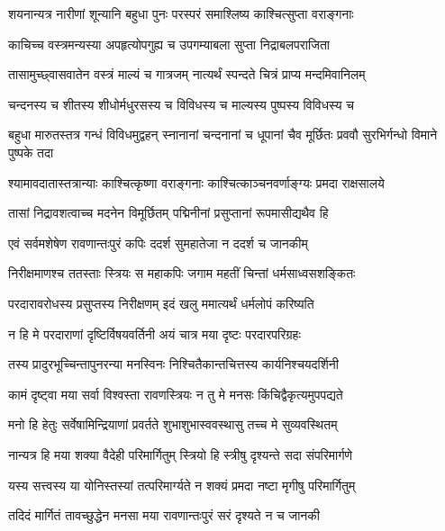 \twolineshloka
{शयनान्यत्र नारीणां शून्यानि बहुधा पुनः}
{परस्परं समाश्लिष्य काश्चित्सुप्ता वराङ्गनाः} %

\twolineshloka
{काचिच्च वस्त्रमन्यस्या अपहृत्योपगुह्य च}
{उपगम्याबला सुप्ता निद्राबलपराजिता} %

\twolineshloka
{तासामुच्छ्वासवातेन वस्त्रं माल्यं च गात्रजम्}
{नात्यर्थं स्पन्दते चित्रं प्राप्य मन्दमिवानिलम्} %

\twolineshloka
{चन्दनस्य च शीतस्य शीधोर्मधुरसस्य च}
{विविधस्य च माल्यस्य पुष्पस्य विविधस्य च} %

\threelineshloka
{बहुधा मारुतस्तत्र गन्धं विविधमुद्वहन्}
{स्नानानां चन्दनानां च धूपानां चैव मूर्छितः}
{प्रववौ सुरभिर्गन्धो विमाने पुष्पके तदा} %

\twolineshloka
{श्यामावदातास्तत्रान्याः काश्चित्कृष्णा वराङ्गनाः}
{काश्चित्काञ्चनवर्णाङ्ग्यः प्रमदा राक्षसालये} %

\twolineshloka
{तासां निद्रावशत्वाच्च मदनेन विमूर्छितम्}
{पद्मिनीनां प्रसुप्तानां रूपमासीद्यथैव हि} %

\twolineshloka
{एवं सर्वमशेषेण रावणान्तःपुरं कपिः}
{ददर्श सुमहातेजा न ददर्श च जानकीम्} %

\twolineshloka
{निरीक्षमाणश्च ततस्ताः स्त्रियः स महाकपिः}
{जगाम महतीं चिन्तां धर्मसाध्वसशङ्कितः} %

\twolineshloka
{परदारावरोधस्य प्रसुप्तस्य निरीक्षणम्}
{इदं खलु ममात्यर्थं धर्मलोपं करिष्यति} %

\twolineshloka
{न हि मे परदाराणां दृष्टिर्विषयवर्तिनी}
{अयं चात्र मया दृष्टः परदारपरिग्रहः} %

\twolineshloka
{तस्य प्रादुरभूच्चिन्तापुनरन्या मनस्विनः}
{निश्चितैकान्तचित्तस्य कार्यनिश्चयदर्शिनी} %

\twolineshloka
{कामं दृष्ट्वा मया सर्वा विश्वस्ता रावणस्त्रियः}
{न तु मे मनसः किंचिद्वैकृत्यमुपपद्यते} %

\twolineshloka
{मनो हि हेतुः सर्वेषामिन्द्रियाणां प्रवर्तते}
{शुभाशुभास्ववस्थासु तच्च मे सुव्यवस्थितम्} %

\twolineshloka
{नान्यत्र हि मया शक्या वैदेही परिमार्गितुम्}
{स्त्रियो हि स्त्रीषु दृश्यन्ते सदा संपरिमार्गणे} %

\twolineshloka
{यस्य सत्त्वस्य या योनिस्तस्यां तत्परिमार्ग्यते}
{न शक्यं प्रमदा नष्टा मृगीषु परिमार्गितुम्} %

\twolineshloka
{तदिदं मार्गितं तावच्छुद्धेन मनसा मया}
{रावणान्तःपुरं सरं दृश्यते न च जानकी} %


